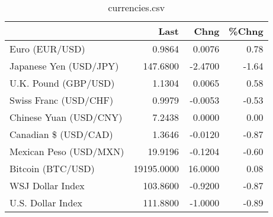 \documentclass{article}%
\begin{document}
%


\begin{table}[htbp]%
\caption{currencies.csv}%
\centering%
\begin{adjustbox}{width=1\textwidth}%
\begin{tabular}{lrrr}
\toprule
                       &       Last &    Chng &  \%Chng \\
\midrule
        Euro (EUR/USD) &     0.9864 &  0.0076 &   0.78 \\
Japanese Yen (USD/JPY) &   147.6800 & -2.4700 &  -1.64 \\
  U.K. Pound (GBP/USD) &     1.1304 &  0.0065 &   0.58 \\
 Swiss Franc (USD/CHF) &     0.9979 & -0.0053 &  -0.53 \\
Chinese Yuan (USD/CNY) &     7.2438 &  0.0000 &   0.00 \\
  Canadian \$ (USD/CAD) &     1.3646 & -0.0120 &  -0.87 \\
Mexican Peso (USD/MXN) &    19.9196 & -0.1204 &  -0.60 \\
     Bitcoin (BTC/USD) & 19195.0000 & 16.0000 &   0.08 \\
      WSJ Dollar Index &   103.8600 & -0.9200 &  -0.87 \\
     U.S. Dollar Index &   111.8800 & -1.0000 &  -0.89 \\
\bottomrule
\end{tabular}
%
\end{adjustbox}%
\end{table}

%
\end{document}
